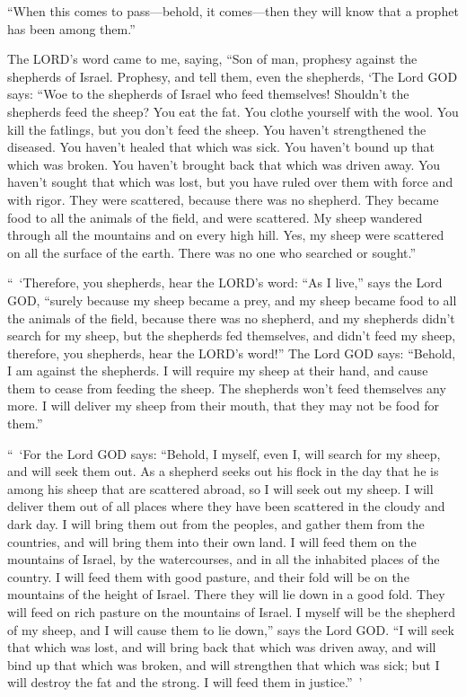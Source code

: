 \myverse{}“When this comes to pass—behold, it comes—then they will know
that a prophet has been among them.”


\mychapter{} \myverse*{}The LORD’s word came to me, saying,
\myverse{}“Son of man, prophesy against the shepherds of Israel. Prophesy, and tell them,
even the shepherds, ‘The Lord GOD says: “Woe to the shepherds of Israel who feed themselves! Shouldn’t
the shepherds feed the sheep?
\myverse{}You eat the fat. You clothe yourself with the wool. You kill the fatlings,
but you don’t feed the sheep.
\myverse{}You haven’t strengthened the diseased. You haven’t healed that which was sick.
You haven’t bound up that which was broken. You haven’t brought back that which was driven away. You haven’t
sought that which was lost, but you have ruled over them with force and with rigor.
\myverse{}They were scattered, because there was no shepherd. They became food to all
the animals of the field, and were scattered.
\myverse{}My sheep wandered through all the mountains and on every high hill. Yes, my
sheep were scattered on all the surface of the earth. There was no one who searched or sought.”

\myverse{}“ ‘Therefore, you shepherds, hear the LORD’s word:
\myverse{}“As I live,” says the Lord GOD, “surely because my sheep became a prey, and
my sheep became food to all the animals of the field, because there was no shepherd, and my shepherds
didn’t search for my sheep, but the shepherds fed themselves, and didn’t feed my sheep,
\myverse{}therefore, you shepherds, hear the LORD’s word!”
\myverse{}The Lord GOD says: “Behold, I am against the shepherds. I will require my
sheep at their hand, and cause them to cease from feeding the sheep. The shepherds won’t feed themselves
any more. I will deliver my sheep from their mouth, that they may not be food for them.”

\myverse{}“ ‘For the Lord GOD says: “Behold, I myself, even I, will search
for my sheep, and will seek them out.
\myverse{}As a shepherd seeks out his flock in the day that he is among his sheep that
are scattered abroad, so I will seek out my sheep. I will deliver them out of all places where they have
been scattered in the cloudy and dark day.
\myverse{}I will bring them out from the peoples, and gather them from the countries,
and will bring them into their own land. I will feed them on the mountains of Israel, by the watercourses,
and in all the inhabited places of the country.
\myverse{}I will feed them with good pasture, and their fold will be on the mountains
of the height of Israel. There they will lie down in a good fold. They will feed on rich pasture on the
mountains of Israel.
\myverse{}I myself will be the shepherd of my sheep, and I will cause them to lie down,”
says the Lord GOD.
\myverse{}“I will seek that which was lost, and will bring back that which was driven
away, and will bind up that which was broken, and will strengthen that which was sick; but I will destroy
the fat and the strong. I will feed them in justice.” ’


